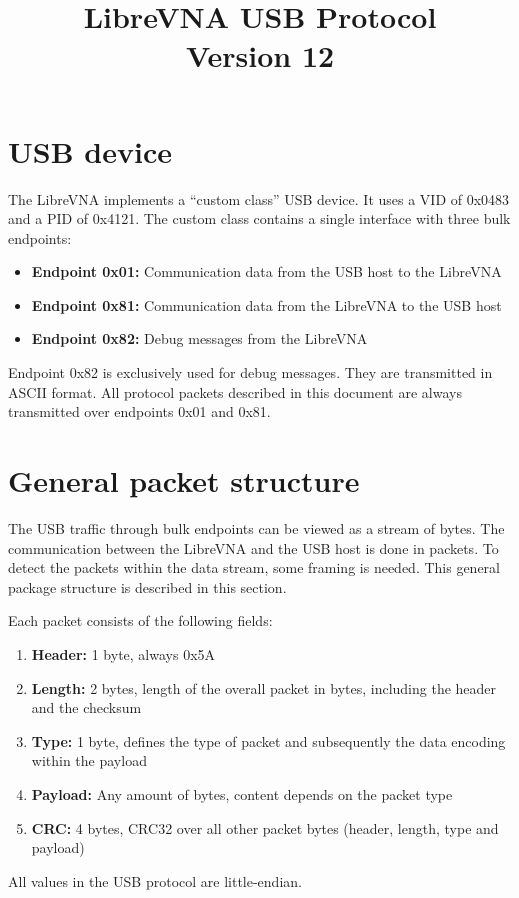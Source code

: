 \documentclass[a4paper,11pt]{article}
\title{LibreVNA USB Protocol\\\small{Version 12}}
\begin{document}
\maketitle
\tableofcontents
\clearpage

\section{USB device}
The LibreVNA implements a ``custom class'' USB device. It uses a VID of 0x0483 and a PID of 0x4121. The custom class contains a single interface with three bulk endpoints:
\begin{itemize}
\item \textbf{Endpoint 0x01:} Communication data from the USB host to the LibreVNA
\item \textbf{Endpoint 0x81:} Communication data from the LibreVNA to the USB host
\item \textbf{Endpoint 0x82:} Debug messages from the LibreVNA
\end{itemize}

Endpoint 0x82 is exclusively used for debug messages. They are transmitted in ASCII format. All protocol packets described in this document are always transmitted over endpoints 0x01 and 0x81.

\section{General packet structure}
The USB traffic through bulk endpoints can be viewed as a stream of bytes. The communication between the LibreVNA and the USB host is done in packets. To detect the packets within the data stream, some framing is needed. This general package structure is described in this section.

Each packet consists of the following fields:
\begin{enumerate}
\item \textbf{Header:} 1 byte, always 0x5A
\item \textbf{Length:} 2 bytes, length of the overall packet in bytes, including the header and the checksum
\item \textbf{Type:} 1 byte, defines the type of packet and subsequently the data encoding within the payload
\item \textbf{Payload:} Any amount of bytes, content depends on the packet type
\item \textbf{CRC:} 4 bytes, CRC32 over all other packet bytes (header, length, type and payload)
\end{enumerate}
\noindent
All values in the USB protocol are little-endian.
\end{document}
